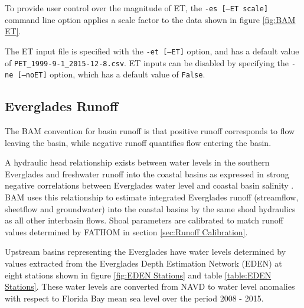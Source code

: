 To provide user control over the magnitude of ET, the \texttt{-es [--ET scale]} command line option applies a scale factor to the data shown in figure \ref{fig:BAM ET}. 

The ET input file is specified with the \texttt{-et [--ET]} option, and has a default value of \texttt{PET\_1999-9-1\_2015-12-8.csv}.  ET inputs can be disabled by specifying the \texttt{-ne [--noET]} option, which has a default value of \texttt{False}. 

\subsection{Everglades Runoff}
\label{sec:Input Data Runoff}
The BAM convention for basin runoff is that positive runoff corresponds to flow leaving the basin, while negative runoff quantifies flow entering the basin.  

A hydraulic head relationship exists between water levels in the southern Everglades and freshwater runoff into the coastal basins as expressed in strong negative correlations between Everglades water level and coastal basin salinity \citep{Tabb1967, Kelble2007}.  BAM uses this relationship to estimate integrated Everglades runoff (streamflow, sheetflow and groundwater) into the coastal basins by the same shoal hydraulics as all other interbasin flows.  Shoal parameters are calibrated to match runoff values determined by FATHOM \citep{Cosby2010} in section \ref{sec:Runoff Calibration}.

Upstream basins representing the Everglades have water levels determined by values extracted from the Everglades Depth Estimation Network (EDEN) at eight stations shown in figure \ref{fig:EDEN Stations} and table \ref{table:EDEN Stations}.  These water levels are converted from NAVD to water level anomalies with respect to Florida Bay mean sea level over the period 2008 - 2015. 

